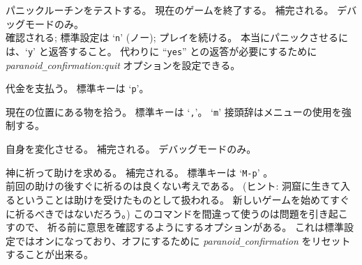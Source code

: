 \item[\tb{\#panic}]
パニックルーチンをテストする。
現在のゲームを終了する。
補完される。
デバッグモードのみ。\\
確認される; 標準設定は `{\tt n}' (ノー); プレイを続ける。
本当にパニックさせるには、`{\tt y}' と返答すること。
代わりに  ``{\tt yes}'' との返答が必要にするために
{\it paranoid\verb+_+confirmation:quit\/}
オプションを設定できる。
\item[\tb{\#pay}]
代金を支払う。
標準キーは `{\tt p}'。
\item[\tb{\#pickup}]
現在の位置にある物を拾う。
標準キーは `{\tt ,}'。
`{\tt m}' 接頭辞はメニューの使用を強制する。
\item[\tb{\#polyself}]
自身を変化させる。
補完される。
デバッグモードのみ。
\item[\tb{\#pray}]
神に祈って助けを求める。
補完される。
標準キーは `{\tt M-p}' 。\\
前回の助けの後すぐに祈るのは良くない考えである。
(ヒント: 洞窟に生きて入るということは助けを受けたものとして扱われる。
新しいゲームを始めてすぐに祈るべきではないだろう。)
このコマンドを間違って使うのは問題を引き起こすので、
祈る前に意思を確認するようにするオプションがある。
これは標準設定ではオンになっており、オフにするために
{\it paranoid\verb+_+confirmation\/} をリセットすることが出来る。
\item[\tb{\#prevmsg}]
